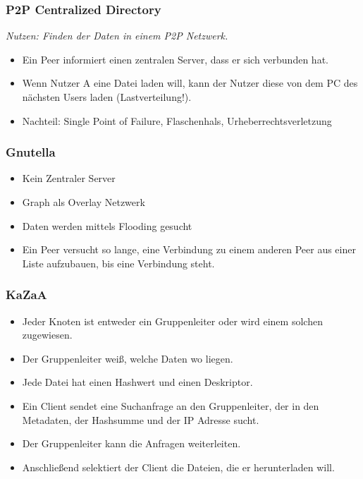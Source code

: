 			\subsubsection{P2P Centralized Directory}
				\textit{Nutzen: Finden der Daten in einem P2P Netzwerk.}

				\begin{itemize}
					\item Ein Peer informiert einen zentralen Server, dass er sich verbunden hat.
					\item Wenn Nutzer A eine Datei laden will, kann der Nutzer diese von dem PC des nächsten Users laden (Lastverteilung!).
					\item Nachteil: Single Point of Failure, Flaschenhals, Urheberrechtsverletzung
				\end{itemize}

			\subsubsection{Gnutella}
				\begin{itemize}
					\item Kein Zentraler Server
					\item Graph als Overlay Netzwerk
					\item Daten werden mittels Flooding gesucht
					\item Ein Peer versucht so lange, eine Verbindung zu einem anderen Peer aus einer Liste aufzubauen, bis eine Verbindung steht.
				\end{itemize}

			\subsubsection{KaZaA}
				\begin{itemize}
					\item Jeder Knoten ist entweder ein Gruppenleiter oder wird einem solchen zugewiesen.
					\item Der Gruppenleiter weiß, welche Daten wo liegen.
					\item Jede Datei hat einen Hashwert und einen Deskriptor.
					\item Ein Client sendet eine Suchanfrage an den Gruppenleiter, der in den Metadaten, der Hashsumme und der IP Adresse sucht.
					\item Der Gruppenleiter kann die Anfragen weiterleiten.
					\item Anschließend selektiert der Client die Dateien, die er herunterladen will.
				\end{itemize}

